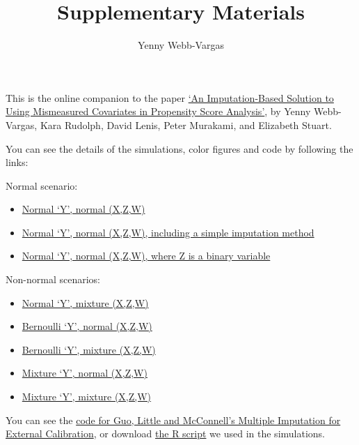 \documentclass[]{article}
\title{Supplementary Materials}
\author{Yenny Webb-Vargas}
\date{}
\begin{document}
\maketitle


This is the online companion to the paper
\href{http://biostats.bepress.com/jhubiostat/paper269/}{`An
Imputation-Based Solution to Using Mismeasured Covariates in Propensity
Score Analysis'}, by Yenny Webb-Vargas, Kara Rudolph, David Lenis, Peter
Murakami, and Elizabeth Stuart.

You can see the details of the simulations, color figures and code by
following the links:

Normal scenario:

\begin{itemize}
\itemsep1pt\parskip0pt
\item
  \href{http://ywebbvar.github.io/PS_MIEC/Simulations/Y_normal_XZW_normal/}{Normal
  `Y', normal (X,Z,W)}
\item
  \href{http://ywebbvar.github.io/PS_MIEC/Simulations/Simple_imputation/}{Normal
  `Y', normal (X,Z,W), including a simple imputation method}
\item
  \href{http://ywebbvar.github.io/PS_MIEC/Simulations/Sample_sizes/}{Normal
  `Y', normal (X,Z,W), where Z is a binary variable}
\end{itemize}

Non-normal scenarios:

\begin{itemize}
\itemsep1pt\parskip0pt
\item
  \href{http://ywebbvar.github.io/PS_MIEC/Simulations/Y_normal_XZW_mixture/}{Normal
  `Y', mixture (X,Z,W)}
\item
  \href{http://ywebbvar.github.io/PS_MIEC/Simulations/Y_bernoulli_XZW_normal/}{Bernoulli
  `Y', normal (X,Z,W)}
\item
  \href{http://ywebbvar.github.io/PS_MIEC/Simulations/Y_bernoulli_XZW_mixture/}{Bernoulli
  `Y', mixture (X,Z,W)}
\item
  \href{http://ywebbvar.github.io/PS_MIEC/Simulations/Y_mixture_XZW_normal/}{Mixture
  `Y', normal (X,Z,W)}
\item
  \href{http://ywebbvar.github.io/PS_MIEC/Simulations/Y_mixture_XZW_mixture/}{Mixture
  `Y', mixture (X,Z,W)}
\end{itemize}

You can see the
\href{http://ywebbvar.github.io/PS_MIEC/MIEC_original/}{code for Guo,
Little and McConnell's Multiple Imputation for External Calibration}, or
download
\href{http://ywebbvar.github.io/PS_MIEC/MIEC_original/MI-EC_algorithm.r}{the
R script} we used in the simulations.
\end{document}
